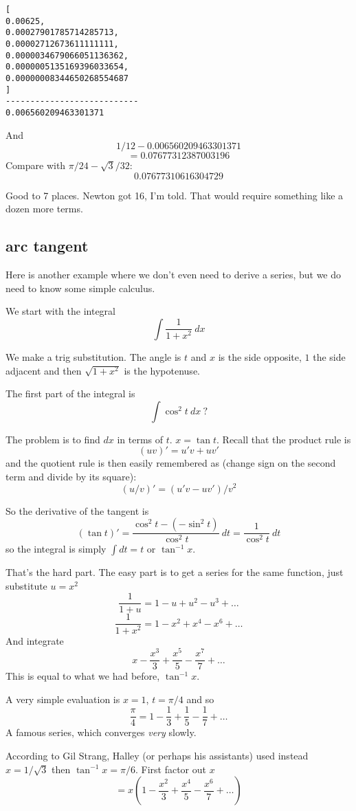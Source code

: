 \documentclass[11pt, oneside]{article}
\begin{document}
\begin{verbatim}
[
0.00625,
0.00027901785714285713,
0.00002712673611111111,
0.0000034679066051136362,
0.0000005135169396033654,
0.00000008344650268554687 
]
---------------------------
0.006560209463301371
\end{verbatim}

And 
\[ 1/12 - 0.006560209463301371 \]
\[ = 0.07677312387003196 \]
Compare with $\pi/24 - \sqrt{3}/32$:
\[ 0.07677310616304729 \]

Good to 7 places.  Newton got 16, I'm told.  That would require something like a dozen more terms.

\subsection*{arc tangent}
Here is another example where we don't even need to derive a series, but we do need to know some simple calculus.

We start with the integral
\[ \int \frac{1}{1 + x^2} \ dx \]

We make a trig substitution.  The angle is $t$ and $x$ is the side opposite, $1$ the side adjacent and then $\sqrt{1 + x^2}$ is the hypotenuse.

The first part of the integral is
\[ \int \cos^2 t  \ dx \ \text{?} \]

The problem is to find $dx$ in terms of $t$.  $x = \tan t$.  Recall that the product rule is
\[ (uv)' = u'v + uv' \]
and the quotient rule is then easily remembered as (change sign on the second term and divide by its square):
\[ (u/v)' = (u'v - uv')/v^2 \]

So the derivative of the tangent is 
\[ (\tan t)' = \frac{ \cos^2 t - (- \sin^2 t)}{\cos^2 t} \ dt = \frac{1}{\cos^2 t} \ dt \]
so the integral is simply $\int dt = t$ or $\tan^{-1} x$.

That's the hard part.  The easy part is to get a series for the same function, just substitute $u = x^2$ 
\[ \frac{1}{1 + u} = 1 - u + u^2 - u^3 + \dots \]
\[ \frac{1}{1 + x^2} = 1 - x^2 + x^4 - x^6 + \dots \]
And integrate
\[ x - \frac{x^3}{3} + \frac{x^5}{5} - \frac{x^7}{7} + \dots \]
This is equal to what we had before, $\tan^{-1} x$.

A very simple evaluation is $x = 1$, $t = \pi/4$ and so
\[ \frac{\pi}{4} = 1 - \frac{1}{3} + \frac{1}{5}  - \frac{1}{7} + \dots \]
A famous series, which converges \emph{very} slowly.

According to Gil Strang, Halley (or perhaps his assistants) used instead $x = 1/\sqrt{3}$ then $\tan^{-1} x = \pi/6$.  First factor out $x$
\[ = x (1 - \frac{x^2}{3} + \frac{x^4}{5} - \frac{x^6}{7} + \dots ) \]
\end{document}
